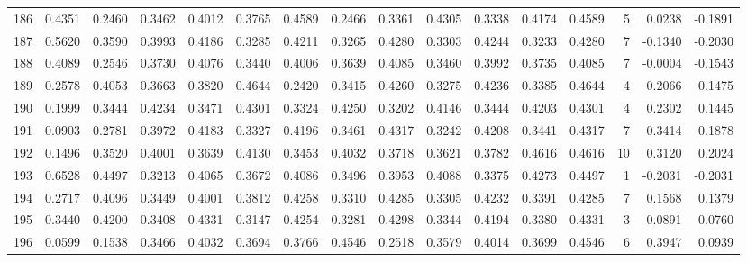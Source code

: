 \begin{tabular}{lrrrrrrrrrrrrrrr}
186 &      0.4351 &  0.2460 &  0.3462 &  0.4012 &  0.3765 &  0.4589 &  0.2466 &  0.3361 &  0.4305 &  0.3338 &   0.4174 &     0.4589 &      5 &                    0.0238 &                    -0.1891 \\
187 &      0.5620 &  0.3590 &  0.3993 &  0.4186 &  0.3285 &  0.4211 &  0.3265 &  0.4280 &  0.3303 &  0.4244 &   0.3233 &     0.4280 &      7 &                   -0.1340 &                    -0.2030 \\
188 &      0.4089 &  0.2546 &  0.3730 &  0.4076 &  0.3440 &  0.4006 &  0.3639 &  0.4085 &  0.3460 &  0.3992 &   0.3735 &     0.4085 &      7 &                   -0.0004 &                    -0.1543 \\
189 &      0.2578 &  0.4053 &  0.3663 &  0.3820 &  0.4644 &  0.2420 &  0.3415 &  0.4260 &  0.3275 &  0.4236 &   0.3385 &     0.4644 &      4 &                    0.2066 &                     0.1475 \\
190 &      0.1999 &  0.3444 &  0.4234 &  0.3471 &  0.4301 &  0.3324 &  0.4250 &  0.3202 &  0.4146 &  0.3444 &   0.4203 &     0.4301 &      4 &                    0.2302 &                     0.1445 \\
191 &      0.0903 &  0.2781 &  0.3972 &  0.4183 &  0.3327 &  0.4196 &  0.3461 &  0.4317 &  0.3242 &  0.4208 &   0.3441 &     0.4317 &      7 &                    0.3414 &                     0.1878 \\
192 &      0.1496 &  0.3520 &  0.4001 &  0.3639 &  0.4130 &  0.3453 &  0.4032 &  0.3718 &  0.3621 &  0.3782 &   0.4616 &     0.4616 &     10 &                    0.3120 &                     0.2024 \\
193 &      0.6528 &  0.4497 &  0.3213 &  0.4065 &  0.3672 &  0.4086 &  0.3496 &  0.3953 &  0.4088 &  0.3375 &   0.4273 &     0.4497 &      1 &                   -0.2031 &                    -0.2031 \\
194 &      0.2717 &  0.4096 &  0.3449 &  0.4001 &  0.3812 &  0.4258 &  0.3310 &  0.4285 &  0.3305 &  0.4232 &   0.3391 &     0.4285 &      7 &                    0.1568 &                     0.1379 \\
195 &      0.3440 &  0.4200 &  0.3408 &  0.4331 &  0.3147 &  0.4254 &  0.3281 &  0.4298 &  0.3344 &  0.4194 &   0.3380 &     0.4331 &      3 &                    0.0891 &                     0.0760 \\
196 &      0.0599 &  0.1538 &  0.3466 &  0.4032 &  0.3694 &  0.3766 &  0.4546 &  0.2518 &  0.3579 &  0.4014 &   0.3699 &     0.4546 &      6 &                    0.3947 &                     0.0939 \\

\end{tabular}
